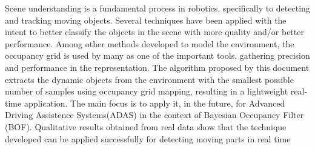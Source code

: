 Scene understanding is a fundamental process in robotics, specifically to detecting and tracking moving objects. Several techniques have been applied with the intent to better classify the objects in the scene with more quality and/or better performance. Among other methods developed to model the environment, the occupancy grid is used by many as one of the important tools, gathering precision and performance in the representation. The algorithm proposed by this document extracts the dynamic objects from the environment with the smallest possible number of samples using occupancy grid mapping, resulting in a lightweight real-time application. The main focus is to apply it, in the future, for  Advanced Driving Assistence Systems(ADAS) in the context of Bayesian Occupancy Filter (BOF). Qualitative results obtained from real data show that the technique developed can be applied successfully for detecting moving parts in real time %


